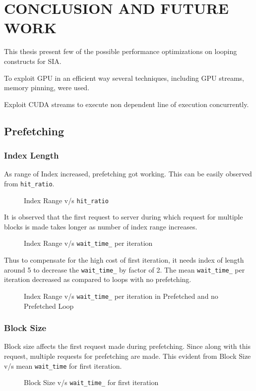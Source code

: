 \chapter{CONCLUSION AND FUTURE WORK}\label{conclusion}

This thesis present few of the possible performance optimizations on looping
constructs for SIA.

To exploit GPU in an efficient way several techniques, including GPU streams,
memory pinning, were used.

Exploit CUDA streams to execute non dependent line of execution concurrently.

\section{Prefetching}
\subsection{Index Length}
As range of Index increased, prefetching got working. This can be easily observed
from \texttt{hit\_ratio}.
\begin{figure}[h]
  
  \caption{Index Range v/s \texttt{hit\_ratio}}
\end{figure}

It is observed that the first request to server during which request for multiple
blocks is made takes longer as number of index range increases.
\begin{figure}[h]
  
  \caption{Index Range v/s \texttt{wait\_time\_} per iteration}
\end{figure}

Thus to compensate for the high cost of first iteration, it needs index of length
around 5 to decrease the \texttt{wait\_time\_} by factor of 2. The mean \texttt{wait\_time\_}
per iteration decreased as compared to loops with no prefetching.
\begin{figure}[h]
  
  \caption{Index Range v/s \texttt{wait\_time\_} per iteration in Prefetched and no Prefetched Loop}
\end{figure}

\subsection{Block Size}
Block size affects the first request made during prefetching. Since along with this
request, multiple requests for prefetching are made. This evident from Block Size
v/s mean \texttt{wait\_time} for first iteration.
\begin{figure}[h]
  
  \caption{Block Size v/s \texttt{wait\_time\_} for first iteration}
\end{figure}

